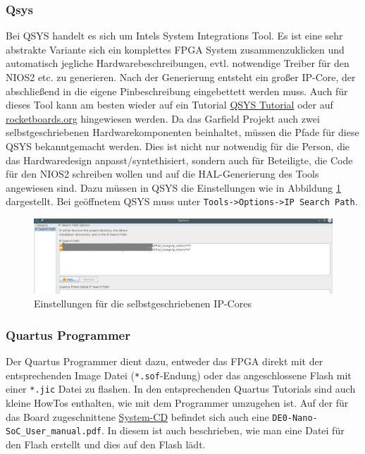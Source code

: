 \subsubsection{Qsys}
Bei QSYS handelt es sich um Intels System Integrations Tool. Es ist eine sehr abstrakte Variante sich ein komplettes \ac{FPGA} System zusammenzuklicken und automatisch jegliche Hardwarebeschreibungen, evtl. notwendige Treiber für den NIOS2 etc. zu generieren. Nach der Generierung entsteht ein großer IP-Core, der abschließend in die eigene Pinbeschreibung eingebettett werden muss. Auch für dieses Tool kann am besten wieder auf ein Tutorial \href{https://www.altera.com/content/dam/altera-www/global/en_US/pdfs/literature/tt/tt_qsys_intro.pdf}{QSYS Tutorial} oder auf \href{rocketboards.org}{rocketboards.org} hingewiesen werden.
Da das Garfield Projekt auch zwei selbstgeschriebenen Hardwarekomponenten beinhaltet, müssen die Pfade für diese QSYS bekanntgemacht werden. Dies ist nicht nur notwendig für die Person, die das Hardwaredesign anpasst/syntethisiert, sondern auch für Beteiligte, die Code für den NIOS2 schreiben wollen und auf die \ac{HAL}-Generierung des Tools angewiesen sind. Dazu müssen in QSYS die Einstellungen wie in Abbildung \ref{Settings:IP} dargestellt. Bei geöffnetem QSYS muss unter \texttt{Tools->Options->IP Search Path}.

\begin{figure}
	\includegraphics[width=\textwidth]{Abb/Qsys_settings.png}
	\caption{Einstellungen für die selbstgeschriebenen \ac{IP}-Cores}
	\label{Settings:IP}
\end{figure}

\subsubsection{Quartus Programmer}
Der Quartus Programmer dient dazu, entweder das \ac{FPGA} direkt mit der entsprechenden Image Datei (\texttt{*.sof}-Endung) oder das angeschlossene Flash mit einer \texttt{*.jic} Datei zu flashen. In den entsprechenden Quartus Tutorials sind auch kleine HowTos enthalten, wie mit dem Programmer umzugehen ist. Auf der für das Board zugeschnittene \href{http://www.terasic.com/downloads/cd-rom/de0-nano-soc/}{System-CD} befindet sich auch eine \texttt{DE0-Nano-SoC\_User\_manual.pdf}. In diesem ist auch beschrieben, wie man eine Datei für den Flash erstellt und dies auf den Flash lädt.

